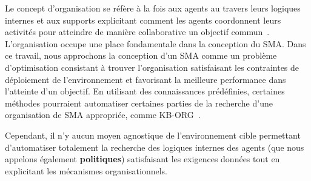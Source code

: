 \documentclass[contribution]{jfsma}
\begin{document}

Le concept d'organisation se réfère à la fois aux agents au travers leurs logiques internes et aux supports explicitant comment les agents coordonnent leurs activités pour atteindre de manière collaborative un objectif commun~\cite{Picard2009}. L'organisation occupe une place fondamentale dans la conception du SMA.
%
%
%
%
%
Dans ce travail, nous approchons la conception d'un SMA comme un problème d’optimisation consistant à trouver l’organisation satisfaisant les contraintes de déploiement de l’environnement et favorisant la meilleure performance dans l’atteinte d’un objectif.
En utilisant des connaissances prédéfinies, certaines méthodes pourraient automatiser certaines parties de la recherche d'une organisation de SMA appropriée, comme KB-ORG~\cite{Sims2008}.

Cependant, il n'y aucun moyen agnostique de l'environnement cible permettant d'automatiser totalement la recherche des logiques internes des agents (que nous appelons également \textbf{politiques}) satisfaisant les exigences données tout en explicitant les mécanismes organisationnels. %
\end{document}
